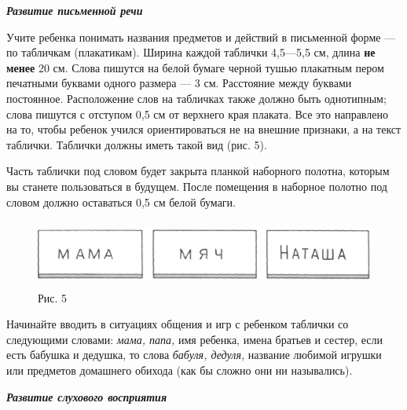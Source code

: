 \documentclass{book}
\renewcommand{\emph}[1]{\textit{#1}}
\begin{document}
\emph{\textbf{Развитие письменной речи}}

Учите ребенка понимать названия предметов и действий в письменной форме
--- по табличкам (плакатикам). Ширина каждой таблички 4,5---5,5 см,
длина \textbf{не менее} 20 см. Слова пишутся на белой бумаге черной
тушью плакатным пером печатными буквами одного размера --- 3 см.
Расстояние между буквами постоянное. Расположение слов на табличках
также должно быть однотипным; слова пишутся с отступом 0,5 см от
верхнего края плаката. Все это направлено на то, чтобы ребенок учился
ориентироваться не на внешние признаки, а на текст таблички. Таблички
должны иметь такой вид (рис. 5).

Часть таблички под словом будет закрыта планкой наборного полотна,
которым вы станете пользоваться в будущем. После помещения в наборное
полотно под словом должно оставаться 0,5 см белой бумаги.


\begin{figure}
\centering
\includegraphics[width=4.71319in,height=0.87361in]{media/media/image5.jpg}
\caption*{Рис. 5}
\end{figure}

Начинайте вводить в ситуациях общения и игр с ребенком таблички со
следующими словами: \emph{мама, папа,} имя ребенка, имена братьев и
сестер, если есть бабушка и дедушка, то слова \emph{бабуля, дедуля,}
название любимой игрушки или предметов домашнего обихода (как бы сложно
они ни назывались).

\emph{\textbf{Развитие слухового восприятия}}
\end{document}
